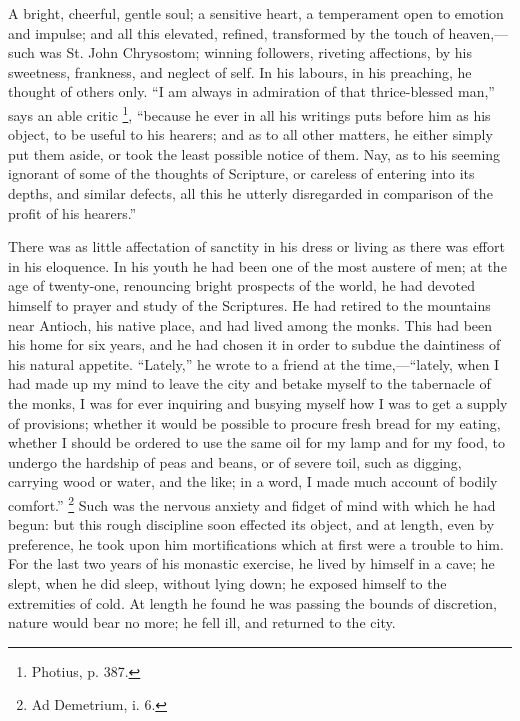 A bright, cheerful, gentle soul; a sensitive heart, a temperament
open to emotion and impulse; and all this elevated, refined,
transformed by the touch of heaven,—such was St. John Chrysostom;
winning followers, riveting affections, by his sweetness, frankness,
and neglect of self. In his labours, in his preaching, he thought of
others only. ``I am always in admiration of that thrice-blessed
man,'' says an able critic \footnote{Photius, p. 387.},
``because he ever in all his writings puts before him as his
object, to be useful to his hearers; and as to all other matters, he
either simply put them aside, or took the least possible notice of
them. Nay, as to his seeming ignorant of some of the thoughts of
Scripture, or careless of entering into its depths, and similar
defects, all this he utterly disregarded in comparison of the profit
of his hearers.''

There was as little affectation of sanctity in his dress or living
as there was effort in his eloquence. In his youth he had been one of
the most austere of men; at the age of twenty-one, renouncing bright
prospects of the world, he had devoted himself to prayer and study of
the Scriptures. He had retired to the mountains near Antioch, his
native place, and had lived among the monks. This had been his home
for six years, and he had chosen it in order to subdue the daintiness
of his natural appetite. ``Lately,'' he wrote to a friend at
the time,—``lately, when I had made up my mind to leave the city
and betake myself to the tabernacle of the monks, I was for ever
inquiring and busying myself how I was to get a supply of provisions;
whether it would be possible to procure fresh bread for my eating,
whether I should be ordered to use the same oil for my lamp and for my
food, to undergo the hardship of peas and beans, or of severe toil,
such as digging, carrying wood or water, and the like; in a word, I
made much account of bodily comfort.'' \footnote{Ad Demetrium, i. 6.} Such was the nervous anxiety and fidget of mind with which he
had begun: but this rough discipline soon effected its object, and at
length, even by preference, he took upon him mortifications which at
first were a trouble to him. For the last two years of his monastic
exercise, he lived by himself in a cave; he slept, when he did sleep, without lying down; he exposed himself to the extremities of
cold. At length he found he was passing the bounds of discretion,
nature would bear no more; he fell ill, and returned to the city.

